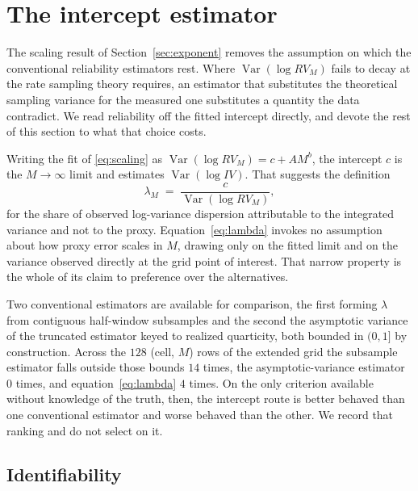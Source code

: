\section{The intercept estimator}\label{sec:estimator}

The scaling result of Section~\ref{sec:exponent} removes the assumption on which
the conventional reliability estimators rest. Where
$\operatorname{Var}(\log RV_M)$ fails to decay at the rate sampling theory
requires, an estimator that substitutes the theoretical sampling variance for the
measured one substitutes a quantity the data contradict. We read reliability off
the fitted intercept directly, and devote the rest of this section to what that
choice costs.

Writing the fit of \eqref{eq:scaling} as $\operatorname{Var}(\log RV_M) = c + A M^{b}$,
the intercept $c$ is the $M \to \infty$ limit and estimates
$\operatorname{Var}(\log IV)$. That suggests the definition
\begin{equation}\label{eq:lambda}
\lambda_M \;=\; \frac{c}{\operatorname{Var}(\log RV_M)} ,
\end{equation}
for the share of observed log-variance dispersion attributable to the integrated
variance and not to the proxy. Equation~\eqref{eq:lambda} invokes no assumption
about how proxy error scales in $M$, drawing only on the fitted limit and on the
variance observed directly at the grid point of interest. That narrow property is
the whole of its claim to preference over the alternatives.

Two conventional estimators are available for comparison, the first forming
$\lambda$ from contiguous half-window subsamples and the second the asymptotic
variance of the truncated estimator keyed to realized quarticity, both bounded in
$(0,1]$ by construction. Across the $128$ (cell, $M$) rows of the
extended grid the subsample estimator falls outside those bounds $14$ times, the %
asymptotic-variance estimator $0$ times, and equation~\eqref{eq:lambda} $4$ %
times. On the only criterion available without knowledge of the truth, then, the %
intercept route is better behaved than one conventional estimator and worse
behaved than the other. We record that ranking and do not select on it.

\subsection{Identifiability}

